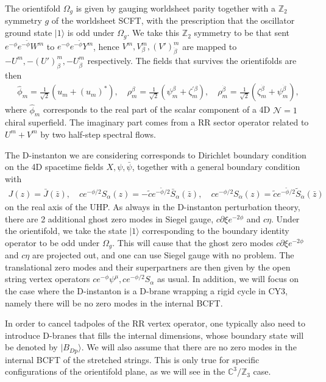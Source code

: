 \documentclass[12pt]{article}
\newcommand{\ie}{\begin{equation}\begin{aligned}}
\newcommand{\fe}{\end{aligned}\end{equation}}
\begin{document}
The orientifold $\Omega_g$ is given by gauging worldsheet parity together with a $\mathbb{Z}_2$ symmetry $g$ of the worldsheet SCFT, with the prescription that the oscillator ground state $|1\rangle$ is odd under $\Omega_g$. We take this $\mathbb{Z}_2$ symmetry to be that sent $e^{-\phi}e^{-\tilde{\phi}}W^m$ to $e^{-\phi}e^{-\tilde{\phi}}Y^m$, hence $V^m, V_\beta^m, (V')_{\dot{\beta}}^m$ are mapped to $-U^m, -(U')_\beta^m, -U_{\dot{\beta}}^m$ respectively. The fields that survives the orientifolds are then
\ie
\hat{\phi}_m=\frac{1}{\sqrt{2}}\left(u_m+\left(u_m\right)^*\right), \quad \rho_m^\beta=\frac{1}{\sqrt{2}}\left(\psi_m^\beta+\zeta_m^{\prime \beta}\right), \quad \rho_m^{\dot{\beta}}=\frac{1}{\sqrt{2}}(\zeta_m^{\dot{\beta}}+\psi_m^{\dot{\beta}}),
\fe
where $\hat{\phi}_m$ corresponds to the real part of the scalar component of a 4D $\mathcal{N}=1$ chiral superfield. The imaginary part comes from a RR sector operator related to $U^m+V^m$ by two half-step spectral flows.

The D-instanton we are considering corresponds to Dirichlet boundary condition on the 4D spacetime fields $X, \psi, \bar{\psi}$, together with a general boundary condition with
\ie
J(z)=\bar{J}(\bar{z}), \quad c e^{-\phi / 2} S_\alpha(z)=-\tilde{c} e^{-\tilde{\phi} / 2} \bar{S}_\alpha(\bar{z}), \quad c e^{-\phi / 2} S_{\dot{\alpha}}(z)=\tilde{c} e^{-\tilde{\phi} / 2} \tilde{S}_{\dot{\alpha}}(\bar{z})
\fe
on the real axis of the UHP. As always in the D-instanton perturbation theory, there are 2 additional ghost zero modes in Siegel gauge, $c\partial \xi e^{-2\phi}$ and $c\eta$. Under the orientifold, we take the state $|1\rangle$ corresponding to the boundary identity operator to be odd under $\Omega_g$. This will cause that the ghost zero modes $c\partial \xi e^{-2\phi}$ and $c\eta$ are projected out, and one can use Siegel gauge with no problem. The translational zero modes and their superpartners are then given by the open string vertex operators $ce^{-\phi}\psi^\mu, ce^{-\phi/2}S_{\alpha}$ as usual. In addition, we will focus on the case where the D-instanton is a D-brane wrapping a rigid cycle in CY3, namely there will be no zero modes in the internal BCFT.

In order to cancel tadpoles of the RR vertex operator, one typically also need to introduce D-branes that fills the internal dimensions, whose boundary state will be denoted by $|B_{D\text{p}}\rangle $. We will also assume that there are no zero modes in the internal BCFT of the stretched strings. This is only true for specific configurations of the orientifold plane, as we will see in the $\mathbb{C}^3/\mathbb{Z}_3$ case.
\end{document}
